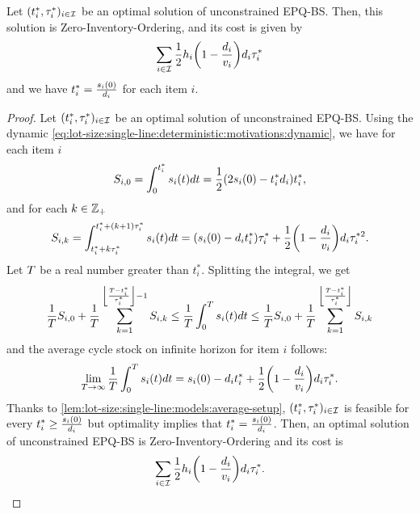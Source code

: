 \begin{lem}\label{lem:lot-size:single-line:models:ZIO}
Let $\bracket{t_i^*,\cover_i^*}_{i\in\REF}$ be an optimal solution of unconstrained EPQ-BS.
Then, this solution is Zero-Inventory-Ordering, and its cost is given by
\begin{equation}
  \sum_{i\in\REF}\frac{1}{2}\holding_i\bracket{1-\frac{\demand_i}{\rate_i}}\demand_i\cover_i^*
\end{equation}
and we have $t_i^*=\frac{s_i(0)}{d_i}$ for each item $i$.
\end{lem}


\begin{proof}
Let $\bracket{t_i^*,\cover_i^*}_{i\in\REF}$ be an optimal solution of unconstrained EPQ-BS.
Using the dynamic \eqref{eq:lot-size:single-line:deterministic:motivations:dynamic}, we have for each item $i$
\begin{equation}
  S_{i,0}
  =
  \int_0^{t_i^*}\inventory_i\bracket{t}dt
  = \frac{1}{2}\bracket{2\inventory_i\bracket{0}-t_i^*\demand_i}t_i^*,
\end{equation}
and for each $k\in\mathbb{Z}_+$
\begin{equation}
  S_{i,k}
  =
  \int_{t_i^*+k\cover_i^*}^{t_i^*+\bracket{k+1}\cover_i^*}\inventory_i(t)dt
  =
  \bracket{\inventory_i(0)-\demand_i t_i^*}\cover_i^*
  + \frac{1}{2}\bracket{1-\frac{\demand_i}{\rate_i}}\demand_i\cover_i^{*2}.
\end{equation}
Let $T$ be a real number greater than $t_i^*$.
Splitting the integral, we get
\begin{equation}
  \frac{1}{\horizon} S_{i,0}
  + \frac{1}{\horizon} \sum_{k=1}^{\left\lfloor\frac{\horizon-t_i^*}{\cover_i^*}\right\rfloor-1} S_{i,k}
  \le
  \frac{1}{\horizon} \int_0^{\horizon}\inventory_i\bracket{t}dt
  \le
  \frac{1}{\horizon} S_{i,0}
  + \frac{1}{\horizon} \sum_{k=1}^{\left\lfloor\frac{\horizon-t_i^*}{\cover_i^*}\right\rfloor} S_{i,k}
\end{equation}
and the average cycle stock on infinite horizon for item $i$ follows:
\begin{equation}
  \lim_{\horizon\rightarrow\infty} \frac{1}{\horizon} \int_0^{\horizon}\inventory_i\bracket{t}dt
  =
  \inventory_i(0)-\demand_i t_i^*
  + \frac{1}{2}\bracket{1-\frac{\demand_i}{\rate_i}}\demand_i\cover_i^*.
\end{equation}
Thanks to \cref{lem:lot-size:single-line:models:average-setup}, $\bracket{t_i^*,\cover_i^*}_{i\in\REF}$ is feasible for every $t_i^*\ge\frac{s_i(0)}{d_i}$ but optimality implies that $t_i^*=\frac{s_i(0)}{d_i}$.
Then, an optimal solution of unconstrained EPQ-BS is Zero-Inventory-Ordering and its cost is
\begin{equation}
  \sum_{i\in\REF}\frac{1}{2}\holding_i\bracket{1-\frac{\demand_i}{\rate_i}}\demand_i\cover_i^*.
\end{equation}
\end{proof}


